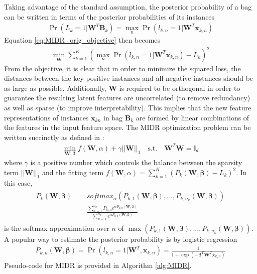 \noindent
Taking advantage of the standard assumption, the posterior probability of a bag can be written in terms of the posterior probabilities of its instances
\begin{align}
	\Pr(L_{k}=1|\bm{W}^{T}\bm{B}_{k}) = \max_{n} \Pr(l_{k,n}=1|\bm{W}^{T}\bm{x}_{k,n}) 
\end{align}
Equation \ref{eq:MIDR_orig_objective} then becomes 
\begin{align}
	\min_{\bm{W}} \sum_{k=1}^{K} (\max_{n} \Pr(l_{k,n}=1|\bm{W}^{T}\bm{x}_{k,n}) - L_{k})^{2}
	\label{eq:MIDR_instance_objective}
\end{align}
\noindent
From the objective, it is clear that in order to minimize the squared loss, the distances between the key positive instances and all negative instances should be as large as possible. Additionally, $\bm{W}$ is required to be orthogonal in order to guarantee the resulting latent features are uncorrelated (to remove redundancy) as well as sparse (to improve interpretability).  This implies that the new feature representations of instances $\bm{x}_{kn}$ in bag $\bm{B}_{k}$ are formed by linear combinations of the features in the input feature space.  The MIDR optimization problem can be written succinctly as defined in \citep{Zhu2018MIDRSparsity}:
\begin{align}
	\min_{\bm{W},\bm{\beta}} f(\bm{W},\alpha) + \gamma ||\bm{W} ||_{1}  \quad \text{s.t.} \quad \bm{W}^{T}\bm{W} = \mathbb{I}_{d}
	\label{eq:MIDR_objective}
\end{align}
\noindent
where $\gamma$ is a positive number which controls the balance between the sparsity term $||\bm{W}||_{1}$ and the fitting term $f(\bm{W},\alpha)=\sum_{k=1}^{K} (P_{k}(\bm{W},\bm{\beta}) - L_{k})^{2}$.  In this case, 
\begin{align}
	\begin{split}
	P_{k}(\bm{W},\bm{\beta}) &= softmax_{\alpha}(P_{k,1}(\bm{\bm{W}},\bm{\beta}), \dots, P_{k,n_{k}}(\bm{\bm{W}},\bm{\beta})) \\
	&= \frac{\sum_{n=1}^{n_{k}}P_{k,n}e^{\alpha P_{k,n}(\bm{W},\bm{\beta})}}{\sum_{n=1}^{n_{k}}e^{\alpha P_{k,n}(\bm{W},\bm{\beta})}}
	\end{split}
\end{align}
\noindent
is the softmax approximation over $n$ of $\max (P_{k,1}(\bm{\bm{W}},\bm{\beta}), \dots, P_{k,n_{k}}(\bm{\bm{W}},\bm{\beta}))$.  A popular way to estimate the posterior probability is by logistic regression
\begin{align}
	P_{k,n}(\bm{W},\bm{\beta}) = \Pr(l_{k,n}=1|\bm{W}^{T},\bm{x}_{k,n}) = \frac{1}{1+\exp(-\bm{\beta}^{T} \bm{W}^{T}\bm{x}_{k,n})}
\end{align}
\noindent
Pseudo-code for MIDR is provided in Algorithm \ref{alg:MIDR}.


